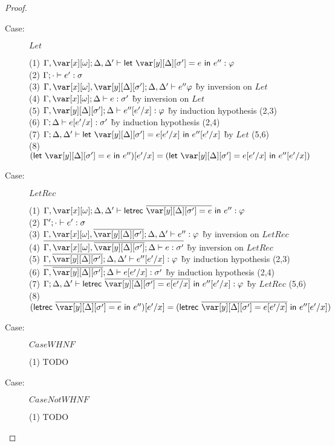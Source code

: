 \begin{proof}
\begin{description}
\item[Case:] $Let$
\begin{tabbing}
    (1) $\G, \xo; \D, \D' \vdash \llet{\yD = e}{e''} : \vp$\\
    (2) $\Gamma; \cdot \vdash e' : \sigma$\\
    (3) $\G,\xo,\yD; \D, \D' \vdash e'' \vp$ \` by inversion on $Let$\\
    (4) $\G,\xo; \D \vdash e : \s'$ \` by inversion on $Let$\\
    (5) $\G,\yD; \D \vdash e''[e'/x] : \vp$ \` by induction hypothesis (2,3)\\
    (6) $\Gamma; \Delta \vdash e[e'/x] : \sigma'$ \` by induction hypothesis (2,4)\\
    (7) $\G;\D,\D' \vdash \llet{\yD = e[e'/x]}{e''[e'/x]}$ \` by $Let$ (5,6)\\
    (8) $(\llet{\yD = e}{e''})[e'/x] = (\llet{\yD = e[e'/x]}{e''[e'/x]})$
\end{tabbing}

\item[Case:] $LetRec$
\begin{tabbing}
    (1) $\G, \xo; \D, \D' \vdash \lletrec{\ov{\yD = e}}{e''} : \vp$\\
    (2) $\Gamma'; \cdot \vdash e' : \sigma$\\
    (3) $\G,\xo,\ov{\yD}; \D, \D' \vdash e'' : \vp$ \` by inversion on $LetRec$\\
    (4) $\ov{\G,\xo, \ov{\yD}; \D \vdash e : \s'}$ \` by inversion on $LetRec$\\
    (5) $\G, \ov{\yD}; \D, \D' \vdash e''[e'/x] : \vp$ \` by induction hypothesis (2,3)\\
    (6) $\ov{\G,\ov{\yD}; \D \vdash e[e'/x] : \s'}$ \` by induction hypothesis (2,4)\\
    (7) $\G; \D, \D' \vdash \lletrec{\ov{\yD = e[e'/x]}}{e''[e'/x]} : \vp$ \` by $LetRec$ (5,6)\\
    (8) $(\lletrec{\ov{\yD = e}}{e''})[e'/x] = (\lletrec{\ov{\yD = e[e'/x]}}{e''[e'/x]})$
\end{tabbing}

\item[Case:] $CaseWHNF$
\begin{tabbing}
    (1) TODO
\end{tabbing}

\item[Case:] $CaseNotWHNF$
\begin{tabbing}
    (1) TODO
\end{tabbing}

\end{description}

\end{proof}

